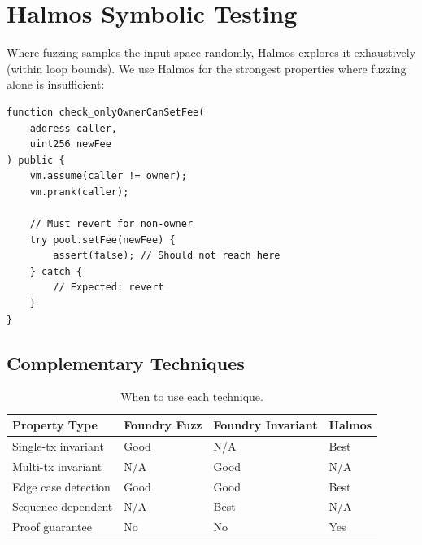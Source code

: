 \section{Halmos Symbolic Testing}


Where fuzzing samples the input space randomly, Halmos explores it exhaustively (within
loop bounds). We use Halmos for the strongest properties where fuzzing alone is
insufficient:

\begin{lstlisting}[language=Solidity,caption={Halmos symbolic test for access control}]
function check_onlyOwnerCanSetFee(
    address caller,
    uint256 newFee
) public {
    vm.assume(caller != owner);
    vm.prank(caller);

    // Must revert for non-owner
    try pool.setFee(newFee) {
        assert(false); // Should not reach here
    } catch {
        // Expected: revert
    }
}
\end{lstlisting}

\subsection{Complementary Techniques}

\begin{table}[H]
\centering
\small
\begin{tabular}{@{}llll@{}}
\toprule
\textbf{Property Type} & \textbf{Foundry Fuzz} & \textbf{Foundry Invariant} & \textbf{Halmos} \\
\midrule
Single-tx invariant & Good & N/A & Best \\
Multi-tx invariant & N/A & Good & N/A \\
Edge case detection & Good & Good & Best \\
Sequence-dependent & N/A & Best & N/A \\
Proof guarantee & No & No & Yes \\
\bottomrule
\end{tabular}
\caption{When to use each technique.}
\end{table}

